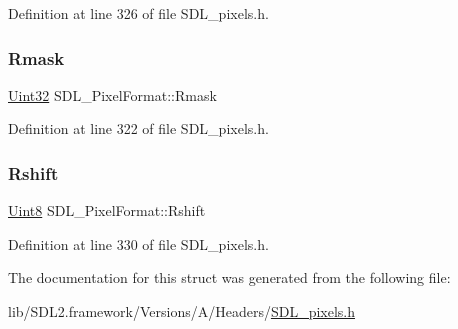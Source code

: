 Definition at line 326 of file S\+D\+L\+\_\+pixels.\+h.

\mbox{\label{struct_s_d_l___pixel_format_a35e5793f6e9c356aec2d130167174946}} 
\subsubsection{\texorpdfstring{Rmask}{Rmask}}
{\footnotesize\ttfamily \mbox{\hyperlink{_s_d_l__stdinc_8h_add440eff171ea5f55cb00c4a9ab8672d}{Uint32}} S\+D\+L\+\_\+\+Pixel\+Format\+::\+Rmask}



Definition at line 322 of file S\+D\+L\+\_\+pixels.\+h.

\mbox{\label{struct_s_d_l___pixel_format_abfdec7b9ee2ee39db630f4022e4e0daa}} 
\subsubsection{\texorpdfstring{Rshift}{Rshift}}
{\footnotesize\ttfamily \mbox{\hyperlink{_s_d_l__stdinc_8h_a2944638813a090aa23e62f4da842c3e2}{Uint8}} S\+D\+L\+\_\+\+Pixel\+Format\+::\+Rshift}



Definition at line 330 of file S\+D\+L\+\_\+pixels.\+h.



The documentation for this struct was generated from the following file\+:\begin{DoxyCompactItemize}
\item 
lib/\+S\+D\+L2.\+framework/\+Versions/\+A/\+Headers/\mbox{\hyperlink{_s_d_l__pixels_8h}{S\+D\+L\+\_\+pixels.\+h}}\end{DoxyCompactItemize}
